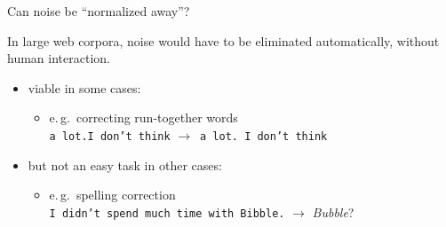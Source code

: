 \begin{frame}
{Can noise be ``normalized away''?}


In large web corpora, noise would have to be eliminated automatically, without human interaction.\\[1ex]

\begin{itemize}
\item viable in some cases:
  \begin{itemize}
  \item e.\,g.\ correcting run-together words\\
   \texttt{a \alert{lot.I} don't think} $\rightarrow$\  \texttt{a lot. I don't think} 
  \end{itemize}
\vspace{1cm}
\pause
\item but not an easy task in other cases:
  \begin{itemize}
  \item e.\,g.\ spelling correction\\
   \texttt{I didn't spend much time with \alert{Bibble}.} $\rightarrow$ \textit{Bubble}?
  \end{itemize}
\end{itemize}
\end{frame}



